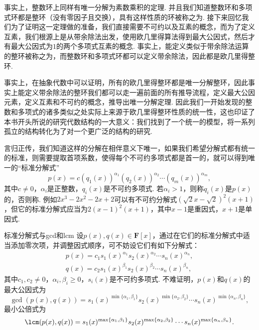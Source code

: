 事实上，整数环上同样有唯一分解为素数乘积的定理. 并且我们知道整数环和多项式环都是整环（没有零因子且交换），具有这样性质的环被称之为. 接下来回忆我们为了证明这一定理做的准备，我们直接需要不可约以及互素的概念，而为了定义互素，我们根源上是从带余除法出发，使用欧几里得算法得到最大公因式，然后才有最大公因式为$1$的两个多项式互素的概念. 事实上，能定义类似于带余除法运算的整环被称之为，而整数环和多项式环都可以定义带余除法，因此都是欧几里得整环.

事实上，在抽象代数中可以证明，所有的欧几里得整环都是唯一分解整环，因此事实上能定义带余除法的整环我们都可以走一遍前面的所有推导流程，定义最大公因元素，定义互素和不可约的概念，推导出唯一分解定理. 因此我们一开始发现的整数和多项式的诸多类似之处实际上来源于欧几里得整环性质的统一性，这也印证了本书开头所说的研究代数结构的一大意义：我们找到了一个统一的模型，将一系列孤立的结构转化为了对一个更广泛的结构的研究.

言归正传，我们知道这样的分解在相伴意义下唯一，如果我们希望分解式都有统一的标准，则需要提取首项系数，使得每个不可约多项式都是首一的，就可以得到唯一的``标准分解式''
\[p(x)=c(q_1(x))^{\alpha_1}(q_2(x))^{\alpha_2}\cdots(q_m(x))^{\alpha_m},\]
其中$c\neq 0$，$\alpha_i$是正整数，$q_i(x)$是不可约多项式. 若$\alpha_i>1$，则称$q_i(x)$是$p(x)$的，否则称. 例如$2x^3-2x^2-2x+2$可以有不可约分解式$(\sqrt{2}x-\sqrt{2})^2(x+1)$，但它的标准分解式应当为$2(x-1)^2(x+1)$，其中$x-1$是重因式，$x+1$是单因式.
\begin{example}{}{标准分解式与gcd和lcm}
    设$p(x),q(x)\in\mathbf{F}[x]$，通过在它们的标准分解式中适当添加零次项，并调整因式顺序，可不妨设它们有如下分解式：
    \begin{gather*}
        p(x)=c_1s_1(x)^{\alpha_1}s_2(x)^{\alpha_2}\cdots s_n(x)^{\alpha_n},\\
        q(x)=c_2s_1(x)^{\beta_1}s_2(x)^{\beta_2}\cdots s_n(x)^{\beta_n},
    \end{gather*}
    其中$c_1,c_2\neq 0$，$\alpha_i,\beta_i\geqslant 0$，$s_i(x)$是不可约多项式. 不难证明，$p(x)$和$q(x)$的最大公因式为
    \[\gcd(p(x),q(x))=s_1(x)^{\min\{\alpha_1,\beta_1\}}s_2(x)^{\min\{\alpha_2,\beta_2\}}\cdots s_n(x)^{\min\{\alpha_n,\beta_n\}},\]
    最小公倍式为
    \[\lcm(p(x),q(x))=s_1(x)^{\max\{\alpha_1,\beta_1\}}s_2(x)^{\max\{\alpha_2,\beta_2\}}\cdots s_n(x)^{\max\{\alpha_n,\beta_n\}}.\]
\end{example}

